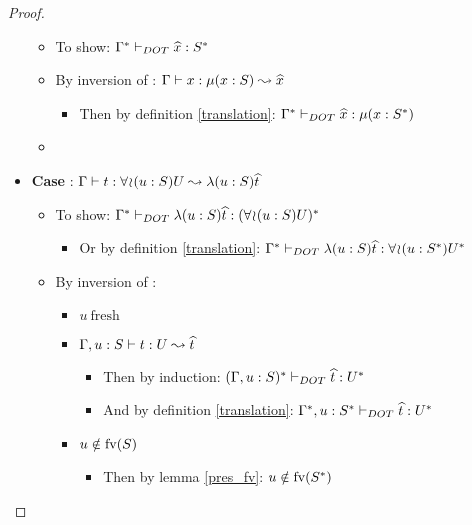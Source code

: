 \begin{proof}
\begin{itemize}
\begin{itemize}
            \item To show: $\Gamma^{*} \vdash_{DOT} \widehat{x}: S^{*}$
            \item By inversion of :
                $\Gamma \vdash x: \mu(x : S) \leadsto \widehat{x}$
            \begin{itemize}
                \item Then by definition \ref{translation}:
                    $\Gamma^{*} \vdash_{DOT} \widehat{x}: \mu(x : S^{*})$
            \end{itemize}
            \item \TODOTHIS {}
        \end{itemize}
        \item \textbf{Case} :
            $\Gamma \vdash t: \forall\!\wr\!(u:S)U \leadsto \lambda(u:S)\widehat{t}$
        \begin{itemize}
            \item To show: $\Gamma^{*} \vdash_{DOT} \lambda(u:S)\widehat{t}: (\forall\!\wr\!(u:S)U)^{*}$
            \begin{itemize}
                \item Or by definition \ref{translation}:
                    $\Gamma^{*} \vdash_{DOT} \lambda(u:S)\widehat{t}: \forall\!\wr\!(u:S^{*})U^{*}$
            \end{itemize}
            \item By inversion of :
            \begin{itemize}
                \item $u\ \text{fresh}$
                \item $\Gamma, u: S \vdash t: U \leadsto \widehat{t}$
                \begin{itemize}
                    \item Then by induction:
                        $(\Gamma, u: S)^{*} \vdash_{DOT} \widehat{t}: U^{*}$
                    \item And by definition \ref{translation}:
                        $\Gamma^{*}, u: S^{*} \vdash_{DOT} \widehat{t}: U^{*}$
                \end{itemize}
                \item $u \notin \text{fv}(S)$
                \begin{itemize}
                    \item Then by lemma \ref{pres_fv}: $u \notin \text{fv}(S^{*})$

\end{itemize}
\end{itemize}
\end{itemize}
\end{itemize}
\end{proof}
